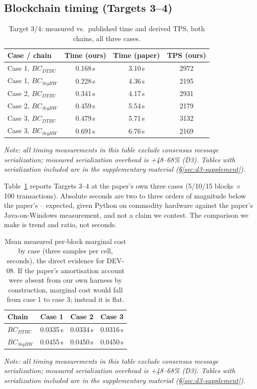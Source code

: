 \documentclass[conference]{IEEEtran}
\begin{document}
\subsection{Blockchain timing (Targets 3--4)}
\label{sec:5c}

\begin{table}[t]
\centering
\caption{Target 3/4: measured vs.\ published time and derived TPS, both chains, all three
cases.}
\label{tab:timing}
\footnotesize
\begin{tabular}{lccc}
\hline
\textbf{Case / chain} & \textbf{Time (ours)} & \textbf{Time (paper)} & \textbf{TPS (ours)} \\
\hline
Case 1, $BC_{DTBU}$  & 0.168\,s & 3.10\,s & 2972 \\
Case 1, $BC_{SigRW}$ & 0.228\,s & 4.36\,s & 2195 \\
Case 2, $BC_{DTBU}$  & 0.341\,s & 4.17\,s & 2931 \\
Case 2, $BC_{SigRW}$ & 0.459\,s & 5.54\,s & 2179 \\
Case 3, $BC_{DTBU}$  & 0.479\,s & 5.71\,s & 3132 \\
Case 3, $BC_{SigRW}$ & 0.691\,s & 6.76\,s & 2169 \\
\hline
\end{tabular}
\vspace{2pt}
{\footnotesize\textit{Note: all timing measurements in this table exclude consensus message
serialization; measured serialization overhead is +48--68\% (D3). Tables with serialization
included are in the supplementary material (\S\ref{sec:d3-supplement}).}}
\end{table}

Table~\ref{tab:timing} reports Targets 3--4 at the paper's own three cases (5/10/15 blocks
$\times$ 100 transactions). Absolute seconds are two to three orders of magnitude below the
paper's -- expected, given Python on commodity hardware against the paper's Java-on-Windows
measurement, and not a claim we contest. The comparison we make is trend and ratio, not seconds.

\begin{table}[t]
\centering
\caption{Mean measured per-block marginal cost by case (three samples per cell, seconds), the
direct evidence for DEV-08. If the paper's amortisation account were absent from our own harness
by construction, marginal cost would fall from case 1 to case 3; instead it is
flat.}
\label{tab:marginal}
\footnotesize
\begin{tabular}{lccc}
\hline
\textbf{Chain} & \textbf{Case 1} & \textbf{Case 2} & \textbf{Case 3} \\
\hline
$BC_{DTBU}$  & 0.0335\,s & 0.0334\,s & 0.0316\,s \\
$BC_{SigRW}$ & 0.0455\,s & 0.0450\,s & 0.0450\,s \\
\hline
\end{tabular}
\vspace{2pt}
{\footnotesize\textit{Note: all timing measurements in this table exclude consensus message
serialization; measured serialization overhead is +48--68\% (D3). Tables with serialization
included are in the supplementary material (\S\ref{sec:d3-supplement}).}}
\end{table}
\end{document}
